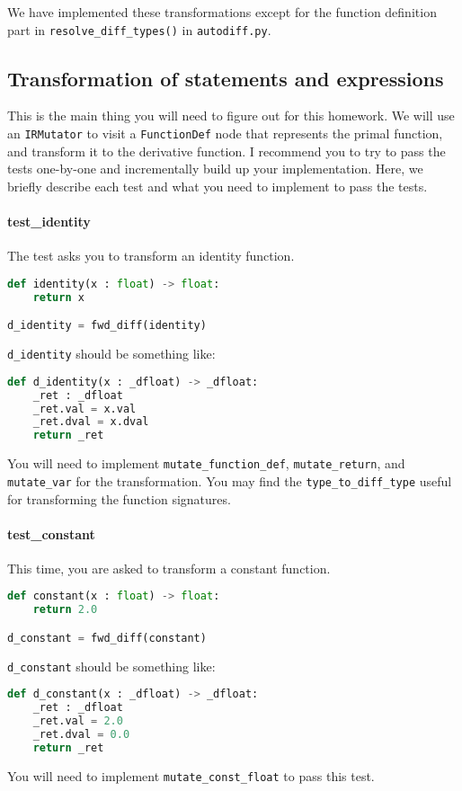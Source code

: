 We have implemented these transformations except for the function definition part in \lstinline{resolve_diff_types()} in \lstinline{autodiff.py}.

\subsection{Transformation of statements and expressions}
This is the main thing you will need to figure out for this homework. We will use an \lstinline{IRMutator} to visit a \lstinline{FunctionDef} node that represents the primal function, and transform it to the derivative function. I recommend you to try to pass the tests one-by-one and incrementally build up your implementation. Here, we briefly describe each test and what you need to implement to pass the tests.

\paragraph{test_identity} The test asks you to transform an identity function.
\begin{lstlisting}[language=Python]
def identity(x : float) -> float:
    return x

d_identity = fwd_diff(identity)
\end{lstlisting}
\lstinline{d_identity} should be something like:
\begin{lstlisting}[language=Python]
def d_identity(x : _dfloat) -> _dfloat:
    _ret : _dfloat
    _ret.val = x.val
    _ret.dval = x.dval
    return _ret
\end{lstlisting}
You will need to implement \lstinline{mutate_function_def}, \lstinline{mutate_return}, and \lstinline{mutate_var} for the transformation. You may find the \lstinline{type_to_diff_type} useful for transforming the function signatures. 

\paragraph{test_constant} This time, you are asked to transform a constant function.
\begin{lstlisting}[language=Python]
def constant(x : float) -> float:
    return 2.0

d_constant = fwd_diff(constant)
\end{lstlisting}
\lstinline{d_constant} should be something like:
\begin{lstlisting}[language=Python]
def d_constant(x : _dfloat) -> _dfloat:
    _ret : _dfloat
    _ret.val = 2.0
    _ret.dval = 0.0
    return _ret
\end{lstlisting}
You will need to implement \lstinline{mutate_const_float} to pass this test.

